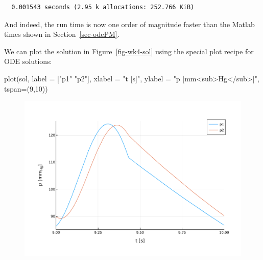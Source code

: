 \documentclass[
  a4paper,
  DIV=11,
  numbers=noendperiod,
  oneside]{scrreprt}
\newenvironment{Shaded}{\begin{snugshade}}{\end{snugshade}}
\newcommand{\FloatTok}[1]{\textcolor[rgb]{0.68,0.00,0.00}{#1}}
\newcommand{\FunctionTok}[1]{\textcolor[rgb]{0.28,0.35,0.67}{#1}}
\newcommand{\NormalTok}[1]{\textcolor[rgb]{0.00,0.23,0.31}{#1}}
\newcommand{\OperatorTok}[1]{\textcolor[rgb]{0.37,0.37,0.37}{#1}}
\newcommand{\StringTok}[1]{\textcolor[rgb]{0.13,0.47,0.30}{#1}}
\begin{document}
\begin{verbatim}
  0.001543 seconds (2.95 k allocations: 252.766 KiB)
\end{verbatim}

And indeed, the run time is now one order of magnitude faster than the
Matlab times shown in Section~\ref{sec-odePM}.

We can plot the solution in Figure~\ref{fig-wk4-sol} using the special
plot recipe for ODE solutions:

\begin{Shaded}
\begin{Highlighting}[]
\FunctionTok{plot}\NormalTok{(sol,}
\NormalTok{     label }\OperatorTok{=}\NormalTok{ [}\StringTok{"p1"} \StringTok{"p2"}\NormalTok{],}
\NormalTok{     xlabel }\OperatorTok{=} \StringTok{"t [s]"}\NormalTok{,}
\NormalTok{     ylabel }\OperatorTok{=} \StringTok{"p [mm\textless{}sub\textgreater{}Hg\textless{}/sub\textgreater{}]"}\NormalTok{,}
\NormalTok{     tspan}\OperatorTok{=}\NormalTok{(}\FloatTok{9}\NormalTok{,}\FloatTok{10}\NormalTok{))}
\end{Highlighting}
\end{Shaded}

\begin{figure}[H]


{\centering \includegraphics{ODEsolver_files/mediabag/ODEsolver_files/figure-pdf/fig-wk4-sol-output-1.pdf}

}

\end{figure}
\end{document}
